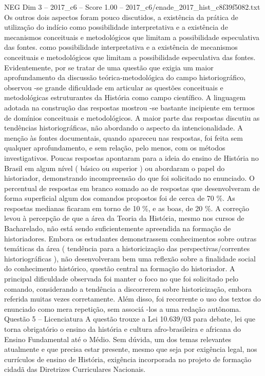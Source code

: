 \begin{textsample}{NEG Dim 3 – 2017\_c6 – Score 1.00 – 2017\_c6/enade\_2017\_hist\_c8f39f5082.txt}
Os outros dois aspectos foram pouco discutidos, a existência da prática de utilização do indício como possibilidade interpretativa e a existência de mecanismos conceituais e metodológicos que limitam a possibilidade especulativa das fontes. como possibilidade interpretativa e a existência de mecanismos conceituais e metodológicos que limitam a possibilidade especulativa das fontes.
Evidentemente, por se tratar de uma questão que exigia um maior aprofundamento da discussão teórica-metodológica do campo historiográfico, observou -se grande dificuldade em articular as questões conceituais e metodológicas estruturantes da História como campo científico.
A linguagem adotada na construção das respostas mostrou -se bastante incipiente em termos de domínios conceituais e metodológicos.
A maior parte das respostas discutiu as tendências historiográficas, não abordando o aspecto da intencionalidade.
A menção às fontes documentais, quando apareceu nas respostas, foi feita sem qualquer aprofundamento, e sem relação, pelo menos, com os métodos investigativos.
Poucas respostas apontaram para a ideia do ensino de História no Brasil em algum nível ( básico ou superior ) ou abordaram o papel do historiador, demonstrando incompreensão do que foi solicitado no enunciado.
O percentual de respostas em branco somado ao de respostas que desenvolveram de forma superficial algum dos comandos propostos foi de cerca de 70 \%.
As respostas medianas ficaram em torno de 10 \%, e as boas, de 20 \%.
A correção levou à percepção de que a área da Teoria da História, mesmo nos cursos de Bacharelado, não está sendo suficientemente apreendida na formação de historiadores.
Embora os estudantes demonstrassem conhecimentos sobre outras temáticas da área ( tendência para a historicização das perspectivas/correntes historiográficas ), não desenvolveram bem uma reflexão sobre a finalidade social do conhecimento histórico, questão central na formação do historiador.
A principal dificuldade observada foi manter o foco no que foi solicitado pelo comando, considerando a tendência a discorrerem sobre historicização, embora referida muitas vezes corretamente.
Além disso, foi recorrente o uso dos textos do enunciado como mera repetição, sem associá -los a uma redação autônoma.
Questão 5 – Licenciatura A questão trouxe a Lei 10.639/03 para debate, lei que torna obrigatório o ensino da história e cultura afro-brasileira e africana do Ensino Fundamental até o Médio.
Sem dúvida, um dos temas relevantes atualmente e que precisa estar presente, mesmo que seja por exigência legal, nos currículos de ensino de História, exigência incorporada no projeto de formação cidadã das Diretrizes Curriculares Nacionais.

\end{textsample}
